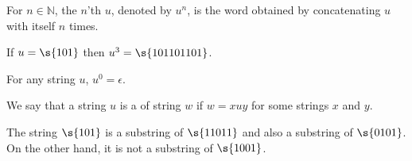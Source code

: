 \begin{flex}
\begin{definition} \label{definition:Powers-of-a-string}
For $n \in \mathbb{N}$, the $n$'th  $u$, denoted by $u^n$, is the word obtained by concatenating $u$ with itself $n$ times.
\end{definition}

\begin{example} \label{example:Third-power-of-101}
If $u = \s{101}$ then $u^3 = \s{101101101}$.
\end{example}

\begin{example} \label{example:Zeroth-power-of-a-string}
For any string $u$, $u^0 = \epsilon$.
\end{example}
\end{flex}

\begin{flex}
\begin{definition}[Substring] \label{definition:Substring}
We say that a string $u$ is a  of string $w$ if $w = xuy$ for some strings $x$ and $y$.
\end{definition}

\begin{example}[$101$ as a substring] \label{example:101-as-a-substring}
The string $\s{101}$ is a substring of $\s{11011}$ and also a substring of $\s{0101}$. 
On the other hand, it is not a substring of $\s{1001}$.
\end{example}
\end{flex}

